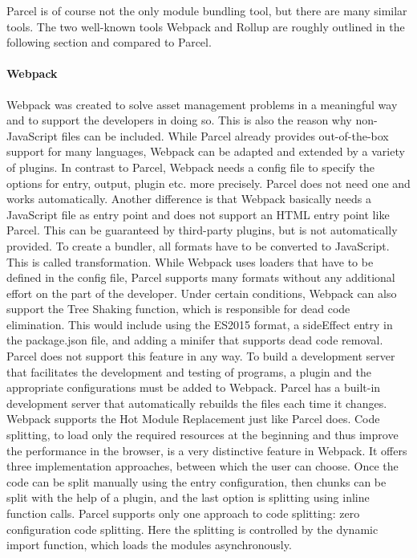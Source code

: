 Parcel is of course not the only module bundling tool, but there are many similar tools. The two well-known tools Webpack and Rollup are roughly outlined in the following section and compared to Parcel.

\paragraph{Webpack}
\label{par:tecWebpack}
Webpack was created to solve asset management problems in a meaningful way and to support the developers in doing so. This is also the reason why non-JavaScript files can be included. While Parcel already provides out-of-the-box support for many languages, Webpack can be adapted and extended by a variety of plugins. In contrast to Parcel, Webpack needs a config file to specify the options for entry, output, plugin etc. more precisely. Parcel does not need one and works automatically. Another difference is that Webpack basically needs a JavaScript file as entry point and does not support an HTML entry point like Parcel. This can be guaranteed by third-party plugins, but is not automatically provided. To create a bundler, all formats have to be converted to JavaScript. This is called transformation. While Webpack uses loaders that have to be defined in the config file, Parcel supports many formats without any additional effort on the part of the developer. Under certain conditions, Webpack can also support the Tree Shaking function, which is responsible for dead code elimination. This would include using the ES2015 format, a sideEffect entry in the package.json file, and adding a minifer that supports dead code removal. Parcel does not support this feature in any way. To build a development server that facilitates the development and testing of programs, a plugin and the appropriate configurations must be added to Webpack. Parcel has a built-in development server that automatically rebuilds the files each time it changes. Webpack supports the Hot Module Replacement just like Parcel does. Code splitting, to load only the required resources at the beginning and thus improve the performance in the browser, is a very distinctive feature in Webpack. It offers three implementation approaches, between which the user can choose. Once the code can be split manually using the entry configuration, then chunks can be split with the help of a plugin, and the last option is splitting using inline function calls. Parcel supports only one approach to code splitting: zero configuration code splitting. Here the splitting is controlled by the dynamic import function, which loads the modules asynchronously.

